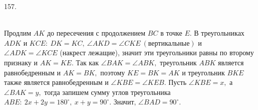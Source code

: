 157. \begin{figure}[ht!]
\end{figure}\\
Продлим $AK$ до пересечения с продолжением $BC$ в точке $E.$  В треугольниках $ADK$ и $KCE:\ DK=KC,\ \angle AKD=\angle CKE\ (\text{вертикальные})$ и $\angle ADK=\angle KCE$ (накрест лежащие), значит эти треугольники равны по второму признаку и $AK=KE.$ Так как $\angle BAK=\angle ABK,$ треугольник $ABK$ является равнобедренным и $AK=BK,$ поэтому $KE=BK=AK$ и треугольник $BKE$ также является равнобедренным и  $\angle KBE=\angle KEB.$ Пусть $\angle KBE=x,$ а $\angle BAK=y,$ тогда запишем сумму углов треугольника $ABE:\ 2x+2y=180^\circ,\ x+y=90^\circ.$ Значит, $\angle BAD=90^\circ.$\\
